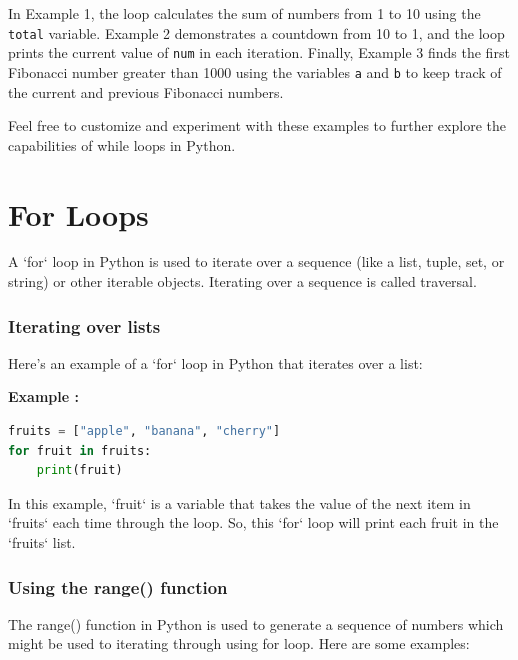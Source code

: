 \documentclass[12pt]{book}
\newtheorem{Example}{Example}[chapter]
\renewenvironment{Example}{\begin{trivlist}\item\relax
\textbf{Example \thesection: }}{\end{trivlist}}
\begin{document}
In Example 1, the loop calculates the sum of numbers from 1 to 10 using the \texttt{total} variable. Example 2 demonstrates a countdown from 10 to 1, and the loop prints the current value of \texttt{num} in each iteration. Finally, Example 3 finds the first Fibonacci number greater than 1000 using the variables \texttt{a} and \texttt{b} to keep track of the current and previous Fibonacci numbers.

Feel free to customize and experiment with these examples to further explore the capabilities of while loops in Python.

\section{For Loops}

A `for` loop in Python is used to iterate over a sequence (like a list, tuple, set, or string) or other iterable objects. Iterating over a sequence is called traversal. 

\subsubsection{Iterating over lists}
Here's an example of a `for` loop in Python that iterates over a list:
\begin{Example}
\begin{lstlisting}[language=Python]
fruits = ["apple", "banana", "cherry"]
for fruit in fruits:
    print(fruit)
\end{lstlisting}
\end{Example}
In this example, `fruit` is a variable that takes the value of the next item in `fruits` each time through the loop. So, this `for` loop will print each fruit in the `fruits` list.

\subsubsection{Using the range() function}

The range() function in Python is used to generate a sequence of numbers which might be used to iterating through using for loop. Here are some examples:
\end{document}
